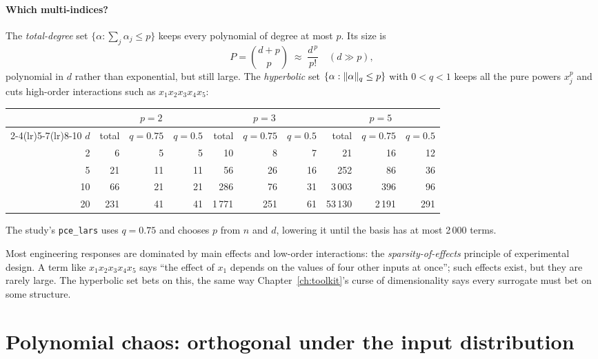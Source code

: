 \paragraph{Which multi-indices?} The \emph{total-degree} set $\{\alpha : \sum_j \alpha_j \le p\}$ keeps every
polynomial of degree at most $p$. Its size is
\begin{equation}
  P = \binom{d+p}{p} \;\approx\; \frac{d^{\,p}}{p!} \quad (d \gg p),
\end{equation}
polynomial in $d$ rather than exponential, but still large. The \emph{hyperbolic} set $\{\alpha : \lVert \alpha\rVert_q \le
p\}$ with $0 < q < 1$ keeps all the pure powers $x_j^{p}$ and cuts high-order interactions such as $x_1x_2x_3x_4x_5$:
\begin{center}
\small
\begin{tabular}{rrrrrrrrrr}
\toprule
 & \multicolumn{3}{c}{$p = 2$} & \multicolumn{3}{c}{$p = 3$} & \multicolumn{3}{c}{$p = 5$} \\
\cmidrule(lr){2-4}\cmidrule(lr){5-7}\cmidrule(lr){8-10}
$d$ & total & $q{=}0.75$ & $q{=}0.5$ & total & $q{=}0.75$ & $q{=}0.5$ & total & $q{=}0.75$ & $q{=}0.5$ \\
\midrule
2  & 6   & 5  & 5  & 10    & 8   & 7  & 21     & 16    & 12  \\
5  & 21  & 11 & 11 & 56    & 26  & 16 & 252    & 86    & 36  \\
10 & 66  & 21 & 21 & 286   & 76  & 31 & 3\,003 & 396   & 96  \\
20 & 231 & 41 & 41 & 1\,771 & 251 & 61 & 53\,130 & 2\,191 & 291 \\
\bottomrule
\end{tabular}
\end{center}
The study's \texttt{pce\_lars} uses $q = 0.75$ and chooses $p$ from $n$ and $d$, lowering it until the basis has at
most 2\,000 terms.

\begin{intuition}
Most engineering responses are dominated by main effects and low-order interactions: the \emph{sparsity-of-effects}
principle of experimental design. A term like $x_1x_2x_3x_4x_5$ says ``the effect of $x_1$ depends on the
values of four other inputs at once''; such effects exist, but they are rarely large. The hyperbolic set bets on
this, the same way Chapter~\ref{ch:toolkit}'s curse of dimensionality says every surrogate must bet on some
structure.
\end{intuition}

\section{Polynomial chaos: orthogonal under the input distribution}
\label{sec:chaos}

